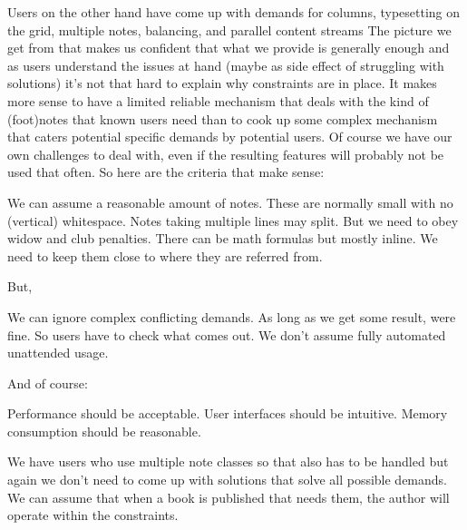 Users on the other hand have come up with demands for columns, typesetting on the
grid, multiple notes, balancing, and parallel content streams The picture we get
from that makes us confident that what we provide is generally enough and as
users understand the issues at hand (maybe as side effect of struggling with
solutions) it's not that hard to explain why constraints are in place. It makes
more sense to have a limited reliable mechanism that deals with the kind of
(foot)notes that known users need than to cook up some complex mechanism that
caters potential specific demands by potential users. Of course we have our own
challenges to deal with, even if the resulting features will probably not be used
that often. So here are the criteria that make sense:

\startitemize[packed]
\startitem We can assume a reasonable amount of notes. \stopitem
\startitem These are normally small with no (vertical) whitespace. \stopitem
\startitem Notes taking multiple lines may split. \stopitem
\startitem But we need to obey widow and club penalties. \stopitem
\startitem There can be math formulas but mostly inline. \stopitem
\startitem We need to keep them close to where they are referred from. \stopitem
\stopitemize

But,

\startitemize[packed]
\startitem We can ignore complex conflicting demands. \stopitem
\startitem As long as we get some result, were fine. \stopitem
\startitem So users have to check what comes out. \stopitem
\startitem We don't assume fully automated unattended usage. \stopitem
\stopitemize

And of course:

\startitemize[packed]
\startitem Performance should be acceptable. \stopitem
\startitem User interfaces should be intuitive. \stopitem
\startitem Memory consumption should be reasonable. \stopitem
\stopitemize

We have users who use multiple note classes so that also has to be handled but
again we don't need to come up with solutions that solve all possible demands. We
can assume that when a book is published that needs them, the author will operate
within the constraints.

